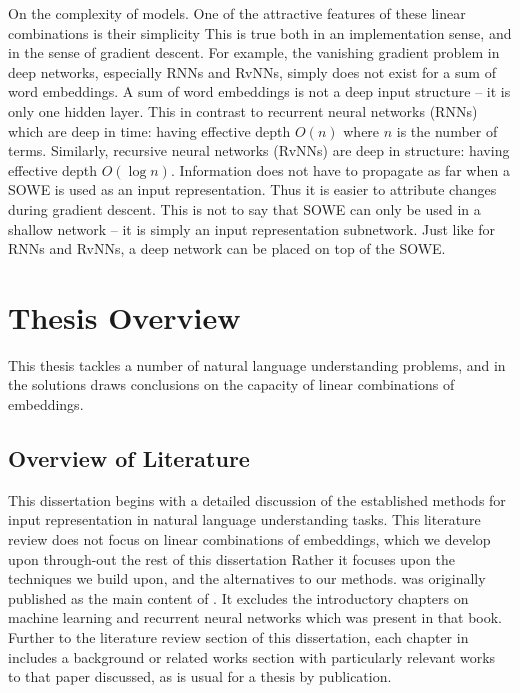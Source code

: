 \documentclass{book}
\begin{document}
On the complexity of models.
One of the attractive features of these linear combinations is their simplicity
This is true both in an implementation sense, and in the sense of gradient descent.
For example, the vanishing gradient problem in deep networks, especially RNNs and RvNNs,
simply does not exist for a sum of word embeddings.
A sum of word embeddings is not a deep input structure -- it is only one hidden layer.
This in contrast to recurrent neural networks (RNNs) which are deep in time: having effective depth $O(n)$ where $n$ is the number of terms.
Similarly, recursive neural networks (RvNNs) are deep in structure: having effective depth $O(\log n)$.
Information does not have to propagate as far when a SOWE is used as an input representation.
Thus it is easier to attribute changes during gradient descent.
This is not to say that SOWE can only be used in a shallow network -- it is simply an input representation subnetwork.
Just like for RNNs and RvNNs, a deep network can be placed on top of the SOWE.


\section{Thesis Overview}
This thesis tackles a number of natural language understanding problems, and in the solutions draws conclusions on the capacity of linear combinations of embeddings.

\subsection{Overview of Literature}
This dissertation begins with a detailed discussion of the established methods for input representation in natural language understanding tasks.
This literature review does not focus on linear combinations of embeddings, which we develop upon through-out the rest of this dissertation
Rather it focuses upon the techniques we build upon, and the alternatives to our methods.
 was originally published as the main content of \citet{NRoNL}.
It excludes the introductory chapters on machine learning and recurrent neural networks which was present in that book.
Further to the literature review section of this dissertation, each chapter in  includes a background or related works section with particularly relevant works to that paper discussed, as is usual for a thesis by publication.
\end{document}
